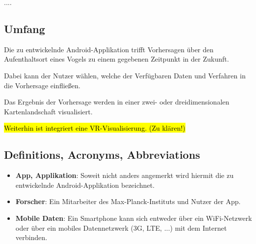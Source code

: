 \documentclass[12pt]{article} %
\begin{document}
....

\subsection{Umfang}

Die zu entwickelnde Android-Applikation trifft Vorhersagen über den Aufenthaltsort eines Vogels zu einem gegebenen Zeitpunkt in der Zukunft. 

Dabei kann der Nutzer wählen, welche der Verfügbaren Daten und Verfahren in die Vorhersage einfließen. 

Das Ergebnis der Vorhersage werden in einer zwei- oder dreidimensionalen Kartenlandschaft visualisiert.

\hl{Weiterhin ist integriert eine VR-Visualisierung. (Zu klären!)}


\subsection{Definitions, Acronyms, Abbreviations}



 

\begin{itemize} 
	\item \textbf{App, Applikation}: Soweit nicht anders angemerkt wird hiermit die zu entwickelnde Android-Applikation bezeichnet.
 	 \item  \textbf{Forscher}: Ein Mitarbeiter des Max-Planck-Instituts und Nutzer der App.
 	 \item \textbf{Mobile Daten}: Ein Smartphone kann sich entweder über ein WiFi-Netzwerk oder über ein mobiles Datennetzwerk (3G, LTE, ...) mit dem Internet verbinden. 
\end{itemize} 
\end{document}
